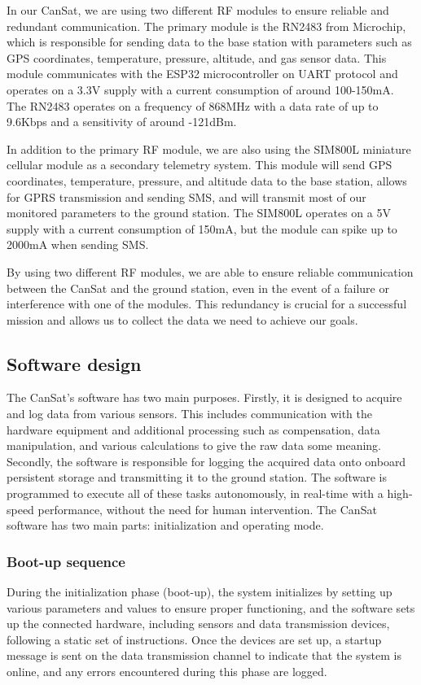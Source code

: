 \documentclass[11pt]{article}
\begin{document}
In our CanSat, we are using two different RF modules to ensure reliable and redundant communication. The primary module is the RN2483 from Microchip, which is responsible for sending data to the base station with parameters such as GPS coordinates, temperature, pressure, altitude, and gas sensor data. This module communicates with the ESP32 microcontroller on UART protocol and operates on a 3.3V supply with a current consumption of around 100-150mA. The RN2483 operates on a frequency of 868MHz with a data rate of up to 9.6Kbps and a sensitivity of around -121dBm.

In addition to the primary RF module, we are also using the SIM800L miniature cellular module as a secondary telemetry system. This module will send GPS coordinates, temperature, pressure, and altitude data to the base station, allows for GPRS transmission and sending SMS, and will transmit most of our monitored parameters to the ground station. The SIM800L operates on a 5V supply with a current consumption of 150mA, but the module can spike up to 2000mA when sending SMS. 

By using two different RF modules, we are able to ensure reliable communication between the CanSat and the ground station, even in the event of a failure or interference with one of the modules. This redundancy is crucial for a successful mission and allows us to collect the data we need to achieve our goals.


\subsection{Software design}

The CanSat’s software has two main purposes. Firstly, it is designed to acquire and log data from various sensors. This includes communication with the hardware equipment and additional processing such as compensation, data manipulation, and various calculations to give the raw data some meaning. Secondly, the software is responsible for logging the acquired data onto onboard persistent storage and transmitting it to the ground station. The software is programmed to execute all of these tasks autonomously, in real-time with a high-speed performance, without the need for human intervention. The CanSat software has two main parts: initialization and operating mode. 

\subsubsection{Boot-up sequence}
During the initialization phase (boot-up), the system initializes by setting up various parameters and values to ensure proper functioning, and the software sets up the connected hardware, including sensors and data transmission devices, following a static set of instructions. Once the devices are set up, a startup message is sent on the data transmission channel to indicate that the system is online, and any errors encountered during this phase are logged.
\end{document}
